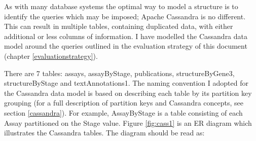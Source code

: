 As with many database systems the optimal way to model a structure is to identify the queries which may be imposed; Apache Cassandra is no different. This can result in multiple tables, containing duplicated data, with either additional or less columns of information. I have modelled the Cassandra data model around the queries outlined in the evaluation strategy of this document (chapter \ref{evaluationstrategy}).

There are 7 tables: assays, assayByStage, publications, structureByGene3, structureByStage and textAnnotations1. The naming convention I adopted for the Cassandra data model is based on describing each table by its partition key grouping (for a full description of partition keys and Cassandra concepts, see section \ref{cassandra}). For example, AssayByStage is a table consisting of each Assay partitioned on the Stage value. Figure \ref{fig:cass1} is an ER diagram which illustrates the Cassandra tables. The diagram should be read as:

